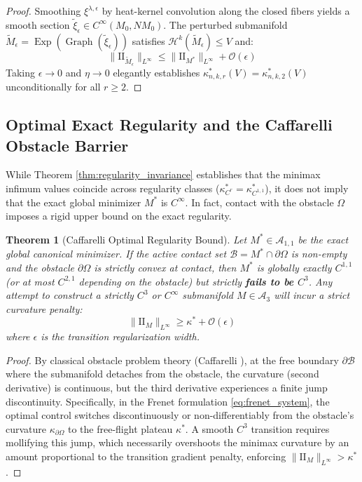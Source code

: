 \documentclass[11pt,reqno]{amsart}
\newtheorem{theorem}{Theorem}[section]
\theoremstyle{definition}
\providecommand{\II}{\mathrm{I\!I}}
\providecommand{\Hsn}{\mathcal{H}}
\numberwithin{equation}{section}
\providecommand{\II}{\mathrm{II}}
\providecommand{\Hsn}{\mathcal{H}}
\begin{document}
\begin{proof}
Smoothing $\xi^{\lambda, \epsilon}$ by heat-kernel convolution along the closed fibers yields a smooth section $\tilde{\xi}_\epsilon \in C^\infty(M_0, NM_0)$. The perturbed submanifold $\tilde{M}_\epsilon = \operatorname{Exp}(\operatorname{Graph}(\tilde{\xi}_\epsilon))$ satisfies $\Hsn^k(\tilde{M}_\epsilon) \le V$ and:
\begin{equation}
\|\II_{\tilde{M}_\epsilon}\|_{L^\infty} \le \|\II_{M^*}\|_{L^\infty} + \mathcal{O}(\epsilon)
\end{equation}
Taking $\epsilon \to 0$ and $\eta \to 0$ elegantly establishes $\kappa^*_{n,k,r}(V) = \kappa^*_{n,k,2}(V)$ unconditionally for all $r \ge 2$.
\end{proof}

\subsection{Optimal Exact Regularity and the Caffarelli Obstacle Barrier}
While Theorem \ref{thm:regularity_invariance} establishes that the minimax infimum values coincide across regularity classes ($\kappa^*_{C^r} = \kappa^*_{C^{1,1}}$), it does not imply that the exact global minimizer $M^*$ is $C^\infty$. In fact, contact with the obstacle $\Omega$ imposes a rigid upper bound on the exact regularity.

\begin{theorem}[Caffarelli Optimal Regularity Bound]
\label{thm:optimal_regularity}
Let $M^* \in \mathcal{A}_{1,1}$ be the exact global canonical minimizer. If the active contact set $\mathcal{B} = M^* \cap \partial\Omega$ is non-empty and the obstacle $\partial\Omega$ is strictly convex at contact, then $M^*$ is globally exactly $C^{1,1}$ (or at most $C^{2,1}$ depending on the obstacle) but strictly \textbf{fails to be $C^3$}. Any attempt to construct a strictly $C^3$ or $C^\infty$ submanifold $M \in \mathcal{A}_3$ will incur a strict curvature penalty:
\begin{equation}
\|\II_M\|_{L^\infty} \ge \kappa^* + \mathcal{O}(\epsilon)
\end{equation}
where $\epsilon$ is the transition regularization width.
\end{theorem}

\begin{proof}
By classical obstacle problem theory (Caffarelli \cite{caffarelli1998}), at the free boundary $\partial \mathcal{B}$ where the submanifold detaches from the obstacle, the curvature (second derivative) is continuous, but the third derivative experiences a finite jump discontinuity. Specifically, in the Frenet formulation \eqref{eq:frenet_system}, the optimal control switches discontinuously or non-differentiably from the obstacle's curvature $\kappa_{\partial\Omega}$ to the free-flight plateau $\kappa^*$. A smooth $C^3$ transition requires mollifying this jump, which necessarily overshoots the minimax curvature by an amount proportional to the transition gradient penalty, enforcing $\|\II_M\|_{L^\infty} > \kappa^*$.
\end{proof}
\end{document}
